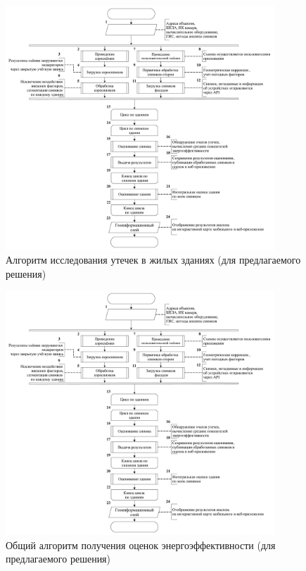 	\begin{figure}[h!]
      \centering
      \includegraphics[width=0.9\textwidth]{images/am/am0_after}
      \caption{Алгоритм исследования утечек в жилых зданиях (для предлагаемого решения)}
      \label{am:after:common}
    \end{figure}

    \begin{figure}[t!]
      \centering
      \includegraphics[width=0.9\textwidth]{images/am/am0_after}
      \caption{Общий алгоритм получения оценок энергоэффективности (для предлагаемого решения)}
      \label{am:after:integral}
    \end{figure}

